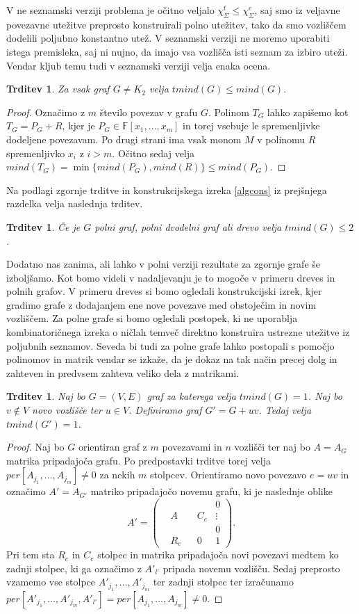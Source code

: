 \documentclass[12pt,a4paper,twoside]{article}
\theoremstyle{definition} %
\theoremstyle{plain} %
\newtheorem{trditev}[definicija]{Trditev}
\newcommand{\ec}{\chi_{\Sigma}^e}
\newcommand{\ect}{\chi_{\Sigma}^t}
\numberwithin{equation}{section}  %
\begin{document}
V ne seznamski verziji problema je očitno veljalo $\ect \le \ec$, saj smo iz veljavne povezavne utežitve preprosto konstruirali polno utežitev, tako da smo vozliščem dodelili poljubno konstantno utež. V seznamski verziji ne moremo uporabiti istega premisleka, saj ni nujno, da imajo vsa vozlišča isti seznam za izbiro uteži. Vendar kljub temu tudi v seznamski verziji velja enaka ocena.
\begin{trditev}
Za vsak graf $G \neq K_2$ velja $tmind(G) \le mind(G).$
\end{trditev}
\begin{proof}
Označimo z $m$ število povezav v grafu $G$. Polinom $T_G$ lahko zapišemo kot $T_G = P_G + R$, kjer je $P_G \in \mathbb{F}[x_1, \ldots, x_m]$ in torej vsebuje le spremenljivke dodeljene povezavam. Po drugi strani ima vsak monom $M$ v polinomu $R$ spremenljivko $x_i$ z $i > m$. Očitno sedaj velja $mind(T_G) = \min \{mind(P_G), mind(R)\} \le mind(P_G)$.
\end{proof}
Na podlagi zgornje trditve in konstrukcijskega izreka \ref{algcons} iz prejšnjega razdelka velja naslednja trditev.
\begin{trditev}
Če je $G$ polni graf, polni dvodelni graf ali drevo velja $tmind(G) \le 2$.
\end{trditev}
Dodatno nas zanima, ali lahko v polni verziji rezultate za zgornje grafe še izboljšamo. Kot bomo videli v nadaljevanju je to mogoče v primeru dreves in polnih grafov. V primeru dreves si bomo ogledali konstrukcijski izrek, kjer gradimo grafe z dodajanjem ene nove povezave med obstoječim in novim  vozliščem. Za polne grafe si bomo ogledali postopek, ki ne uporablja kombinatoričnega izreka o ničlah temveč direktno konstruira ustrezne utežitve iz poljubnih seznamov. Seveda bi tudi za polne grafe lahko postopali s pomočjo polinomov in matrik vendar se izkaže, da je dokaz na tak način precej dolg in zahteven in predvsem zahteva veliko dela z matrikami.
\begin{trditev}
Naj bo $G=(V,E)$ graf za katerega velja $tmind(G) = 1$. Naj bo $v \notin V$ novo vozlišče ter $u \in V$. Definiramo graf $G' = G + uv$. Tedaj velja $tmind(G') =1$.
\end{trditev}
 \begin{proof}
Naj bo $G$ orientiran graf z $m$ povezavami in $n$ vozlišči ter naj bo $A = A_G$ matrika pripadajoča grafu. Po predpostavki trditve torej velja $per[A_{j_1}, \ldots, A_{j_m}]  \neq 0$ za nekih $m$ stolpcev. Orientiramo novo povezavo $e = uv$ in označimo $A' = A_{G'}$ matriko pripadajočo novemu grafu, ki je naslednje oblike
$$
A' = \left( \begin{matrix}
  &  &  &  & 0 \\
  & A &  & C_e & \vdots \\
  &  &  &  & 0 \\ 
 & R_e &  & 0 & 1 
\end{matrix} \right).
$$
Pri tem sta $R_e$ in $C_e$ stolpec in matrika pripadajoča novi povezavi medtem ko zadnji stolpec, ki ga označimo z $A'_{l'}$ pripada novemu vozlišču. Sedaj preprosto vzamemo vse stolpce $A'_{j_1}, \ldots, A'_{j_m}$ ter zadnji stolpec ter izračunamo 
$per[A'_{j_1}, \ldots, A'_{j_m}, A'_{l'} ] = per[A_{j_1}, \ldots, A_{j_m}]  \neq 0$.
\end{proof}
\end{document}
